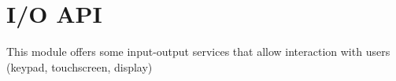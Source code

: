 \hypertarget{group__ssbx___i_o}{}\section{I/O A\+PI}
\label{group__ssbx___i_o}
This module offers some input-\/output services that allow interaction with users (keypad, touchscreen, display) 